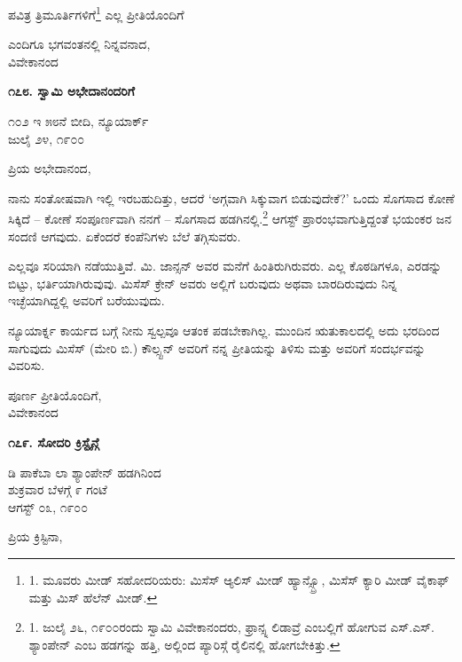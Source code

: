 ಪವಿತ್ರ ತ್ರಿಮೂರ್ತಿಗಳಿಗೆ\footnote{1. ಮೂವರು ಮೀಡ್ ಸಹೋದರಿಯರು: ಮಿಸೆಸ್ ಆ್ಯಲಿಸ್ ಮೀಡ್ ಹ್ಯಾನ್ಸ್ಬ್ರೊ, ಮಿಸೆಸ್ ಕ್ಯಾರಿ ಮೀಡ್ ವೈಕಾಫ್ ಮತ್ತು ಮಿಸ್ ಹೆಲೆನ್ ಮೀಡ್.} ಎಲ್ಲ ಪ್ರೀತಿಯೊಂದಿಗೆ

\begin{flushright}
ಎಂದಿಗೂ ಭಗವಂತನಲ್ಲಿ ನಿನ್ನವನಾದ,\\ವಿವೇಕಾನಂದ
\end{flushright}

\begin{center}
\textbf{೧೭೮. ಸ್ವಾಮಿ ಅಭೇದಾನಂದರಿಗೆ}
\end{center}

\begin{flushright}
೧೦೨ ಇ ೫೮ನೆ ಬೀದಿ, ನ್ಯೂಯಾರ್ಕ್\\ಜುಲೈ ೨೪, ೧೯೦೦
\end{flushright}

ಪ್ರಿಯ ಅಭೇದಾನಂದ,

ನಾನು ಸಂತೋಷವಾಗಿ ಇಲ್ಲಿ ಇರಬಹುದಿತ್ತು, ಆದರೆ ‘ಅಗ್ಗವಾಗಿ ಸಿಕ್ಕುವಾಗ ಬಿಡುವುದೇಕೆ?’ ಒಂದು ಸೊಗಸಾದ ಕೋಣೆ ಸಿಕ್ಕಿದೆ – ಕೋಣೆ ಸಂಪೂರ್ಣವಾಗಿ ನನಗೆ – ಸೊಗಸಾದ ಹಡಗಿನಲ್ಲಿ.\footnote{1. ಜುಲೈ ೨೬, ೧೯೦೦ರಂದು ಸ್ವಾಮಿ ವಿವೇಕಾನಂದರು, ಫ್ರಾನ್ಸ್ನ ಲಿಡಾವ್ರೆ ಎಂಬಲ್ಲಿಗೆ ಹೋಗುವ ಎಸ್.ಎಸ್. ಶ್ಯಾಂಪೇನ್ ಎಂಬ ಹಡಗನ್ನು ಹತ್ತಿ, ಅಲ್ಲಿಂದ ಪ್ಯಾರಿಸ್ಗೆ ರೈಲಿನಲ್ಲಿ ಹೋಗಬೇಕಿತ್ತು.} ಆಗಸ್ಟ್ ಪ್ರಾರಂಭವಾಗುತ್ತಿದ್ದಂತೆ ಭಯಂಕರ ಜನ ಸಂದಣಿ ಆಗವುದು. ಏಕೆಂದರೆ ಕಂಪೆನಿಗಳು ಬೆಲೆ ತಗ್ಗಿಸುವರು.

ಎಲ್ಲವೂ ಸರಿಯಾಗಿ ನಡೆಯುತ್ತಿವೆ. ಮಿ. ಜಾನ್ಸನ್ ಅವರ ಮನೆಗೆ ಹಿಂತಿರುಗಿರುವರು. ಎಲ್ಲ ಕೊಠಡಿಗಳೂ, ಎರಡನ್ನು ಬಿಟ್ಟು, ಭರ್ತಿಯಾಗಿರುವುವು. ಮಿಸೆಸ್ ಕ್ರೇನ್ ಅವರು ಅಲ್ಲಿಗೆ ಬರುವುದು ಅಥವಾ ಬಾರದಿರುವುದು ನಿನ್ನ ಇಚ್ಛೆಯಾಗಿದ್ದಲ್ಲಿ ಅವರಿಗೆ ಬರೆಯುವುದು.

ನ್ಯೂಯಾರ್ಕ್ನ ಕಾರ್ಯದ ಬಗ್ಗೆ ನೀನು ಸ್ವಲ್ಪವೂ ಆತಂಕ ಪಡಬೇಕಾಗಿಲ್ಲ. ಮುಂದಿನ ಋತುಕಾಲದಲ್ಲಿ ಅದು ಭರದಿಂದ ಸಾಗುವುದು ಮಿಸೆಸ್ (ಮೇರಿ ಬಿ.) ಕೌಲ್ಸ್ಟನ್ ಅವರಿಗೆ ನನ್ನ ಪ್ರೀತಿಯನ್ನು ತಿಳಿಸು ಮತ್ತು ಅವರಿಗೆ ಸಂದರ್ಭವನ್ನು ವಿವರಿಸು.

\begin{flushright}
ಪೂರ್ಣ ಪ್ರೀತಿಯೊಂದಿಗೆ,\\ವಿವೇಕಾನಂದ
\end{flushright}

\begin{center}
\textbf{೧೭೯. ಸೋದರಿ ಕ್ರಿಸ್ಟೈನ್ಗೆ}
\end{center}

\begin{flushright}
ಡಿ ಪಾಕೆಬಾ ಲಾ ಶ್ಯಾಂಪೇನ್ ಹಡಗಿನಿಂದ\\ಶುಕ್ರವಾರ ಬೆಳಗ್ಗೆ ೯ ಗಂಟೆ\\ಆಗಸ್ಟ್ ೦೩, ೧೯೦೦
\end{flushright}

ಪ್ರಿಯ ಕ್ರಿಸ್ಟಿನಾ,

